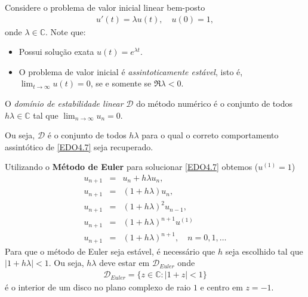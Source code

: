 Considere o problema de valor inicial linear bem-posto
\begin{eqnarray}\label{EDO4.7}
  u'(t)= \lambda u(t), \quad  u(0)=1,
\end{eqnarray}
onde $\lambda  \in  \mathbb{C}$. Note que:
\begin{itemize}
\item Possui solução exata $u(t)=e^{\lambda t}.$
\item O problema de valor inicial é \emph{assintoticamente estável}, isto é, $\lim_{t\rightarrow \infty }u(t)=0$, se e somente se $\Re{\lambda }<0$.
\
\end{itemize}




\begin{defn}
O \emph{domínio de estabilidade linear} $\mathcal D$ do método numérico é o conjunto de todos $h\lambda  \in  \mathbb{C}$ tal que $\lim_{n\rightarrow \infty }u_n=0$.
\end{defn}

Ou seja, $\mathcal D$ é o conjunto de todos $h\lambda $ para o qual o correto comportamento assintótico de \eqref{EDO4.7} seja recuperado.



\begin{ex}
Utilizando o \textbf{Método de Euler} para solucionar \eqref{EDO4.7} obtemos ($u^{(1)}=1$)
\begin{eqnarray}
 u_{n+1}   & =& u_n+h\lambda u_n, \\
 u_{n+1}   & =& (1+h\lambda )u_n, \\
 u_{n+1}   & =& (1+h\lambda )^2u_{n-1}, \\
 u_{n+1}   & =& (1+h\lambda )^{n+1}u^{(1)} \\
 u_{n+1}   & =& (1+h\lambda )^{n+1}  , \quad  n=0,1,\ldots
\end{eqnarray}
Para que o método de Euler seja estável, é necessário que $h$ seja escolhido tal que $|1+h\lambda |<1$. Ou seja, $h\lambda $ deve estar em $\mathcal D_{Euler}$ onde
\begin{eqnarray}
 \mathcal D_{Euler} = \{z \in  \mathbb{C}: |1+z|<1\}
\end{eqnarray}
é o interior de um disco no plano complexo de raio $1$ e centro em $z=-1$.%
\end{ex}



